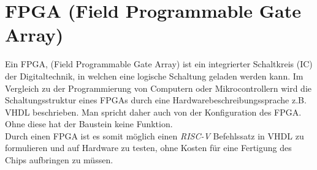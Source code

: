     \section{FPGA (Field Programmable Gate Array)}
        Ein FPGA, (Field Programmable Gate Array) ist ein integrierter Schaltkreis (IC) der Digitaltechnik,
        in welchen eine logische Schaltung geladen werden kann.
        Im Vergleich zu der Programmierung von Computern oder Mikrocontrollern wird die Schaltungsstruktur eines FPGAs durch eine
        Hardwarebeschreibungssprache z.B. VHDL beschrieben. Man spricht daher auch von der Konfiguration des FPGA.
        Ohne diese hat der Baustein keine Funktion. \cite{fpga-wiki}
        \\
        Durch einen FPGA ist es somit möglich einen \textit{RISC-V} Befehlssatz in VHDL zu formulieren und auf Hardware zu testen,
        ohne Kosten für eine Fertigung des Chips aufbringen zu müssen.

